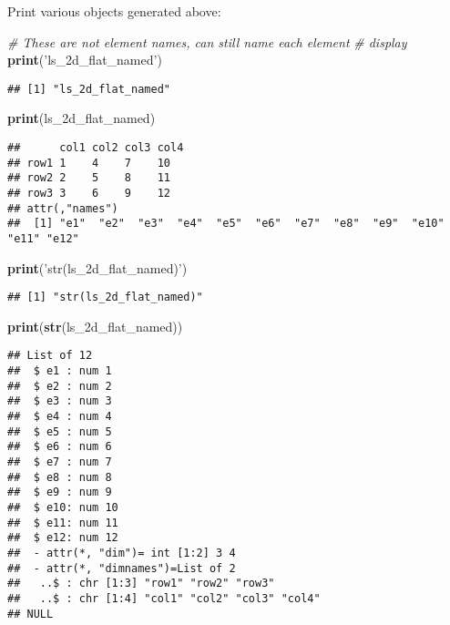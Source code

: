 \documentclass[
]{book}
\newenvironment{Shaded}{\begin{snugshade}}{\end{snugshade}}
\newcommand{\CommentTok}[1]{\textcolor[rgb]{0.56,0.35,0.01}{\textit{#1}}}
\newcommand{\KeywordTok}[1]{\textcolor[rgb]{0.13,0.29,0.53}{\textbf{#1}}}
\newcommand{\NormalTok}[1]{#1}
\newcommand{\StringTok}[1]{\textcolor[rgb]{0.31,0.60,0.02}{#1}}
\begin{document}
Print various objects generated above:

\begin{Shaded}
\begin{Highlighting}[]
\CommentTok{# These are not element names, can still name each element}
\CommentTok{# display}
\KeywordTok{print}\NormalTok{(}\StringTok{'ls_2d_flat_named'}\NormalTok{)}
\end{Highlighting}
\end{Shaded}

\begin{verbatim}
## [1] "ls_2d_flat_named"
\end{verbatim}

\begin{Shaded}
\begin{Highlighting}[]
\KeywordTok{print}\NormalTok{(ls_2d_flat_named)}
\end{Highlighting}
\end{Shaded}

\begin{verbatim}
##      col1 col2 col3 col4
## row1 1    4    7    10  
## row2 2    5    8    11  
## row3 3    6    9    12  
## attr(,"names")
##  [1] "e1"  "e2"  "e3"  "e4"  "e5"  "e6"  "e7"  "e8"  "e9"  "e10" "e11" "e12"
\end{verbatim}

\begin{Shaded}
\begin{Highlighting}[]
\KeywordTok{print}\NormalTok{(}\StringTok{'str(ls_2d_flat_named)'}\NormalTok{)}
\end{Highlighting}
\end{Shaded}

\begin{verbatim}
## [1] "str(ls_2d_flat_named)"
\end{verbatim}

\begin{Shaded}
\begin{Highlighting}[]
\KeywordTok{print}\NormalTok{(}\KeywordTok{str}\NormalTok{(ls_2d_flat_named))}
\end{Highlighting}
\end{Shaded}

\begin{verbatim}
## List of 12
##  $ e1 : num 1
##  $ e2 : num 2
##  $ e3 : num 3
##  $ e4 : num 4
##  $ e5 : num 5
##  $ e6 : num 6
##  $ e7 : num 7
##  $ e8 : num 8
##  $ e9 : num 9
##  $ e10: num 10
##  $ e11: num 11
##  $ e12: num 12
##  - attr(*, "dim")= int [1:2] 3 4
##  - attr(*, "dimnames")=List of 2
##   ..$ : chr [1:3] "row1" "row2" "row3"
##   ..$ : chr [1:4] "col1" "col2" "col3" "col4"
## NULL
\end{verbatim}
\end{document}
